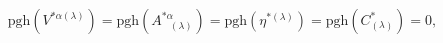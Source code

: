 \begin{equation}
\mathrm{pgh}\left( V^{*\alpha (\lambda )}\right) =\mathrm{pgh}\left(
A_{\;\;\;(\lambda )}^{*\alpha }\right) =\mathrm{pgh}\left( \eta ^{*(\lambda
)}\right) =\mathrm{pgh}\left( C_{(\lambda )}^{*}\right) =0,  \label{bf40}
\end{equation}

